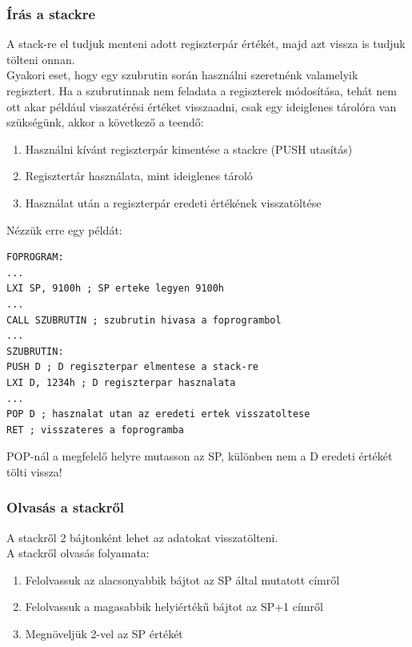 \documentclass{article}
\begin{document}
\subsubsection{Írás a stackre}
A stack-re el tudjuk menteni adott regiszterpár értékét, majd azt vissza is tudjuk tölteni onnan. \\
Gyakori eset, hogy egy szubrutin során használni szeretnénk valamelyik regisztert. Ha a szubrutinnak nem feladata a regiszterek módosítása, tehát nem ott akar például visszatérési értéket visszaadni, csak egy ideiglenes tárolóra van szükségünk, akkor a következő a teendő:
\begin{enumerate}
	\item Használni kívánt regiszterpár kimentése a stackre (PUSH utasítás)
	\item Regisztertár használata, mint ideiglenes tároló
	\item Használat után a regiszterpár eredeti értékének visszatöltése
\end{enumerate}
\newpage
Nézzük erre egy példát:
\begin{lstlisting}[frame=single]
FOPROGRAM:
...
LXI SP, 9100h ; SP erteke legyen 9100h
...
CALL SZUBRUTIN ; szubrutin hivasa a foprogrambol
...
SZUBRUTIN:
PUSH D ; D regiszterpar elmentese a stack-re
LXI D, 1234h ; D regiszterpar hasznalata
...
POP D ; hasznalat utan az eredeti ertek visszatoltese
RET ; visszateres a foprogramba
\end{lstlisting}
\colorbox{orange!30}{POP-nál a megfelelő helyre mutasson az SP, különben nem a D eredeti értékét tölti vissza!}

\subsubsection{Olvasás a stackről}
A stackről 2 bájtonként lehet az adatokat visszatölteni. \\
A stackről olvasás folyamata:
\begin{enumerate}
	\item Felolvassuk az alacsonyabbik bájtot az SP által mutatott címről
	\item Felolvassuk a magasabbik helyiértékű bájtot az SP+1 címről
	\item Megnöveljük 2-vel az SP értékét
\end{enumerate}
\end{document}
